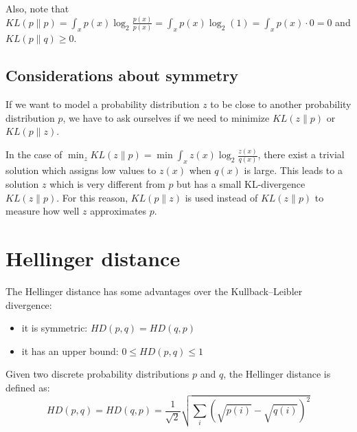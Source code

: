 Also, note that $\mathit{KL}(p \| p) = \int_x p(x) \log_2 \frac{p(x)}{p(x)} = \int_x p(x) \log_2 (1) = \int_x p(x) \cdot 0 = 0$
and $\mathit{KL}(p \| q) \geq 0$.

\subsection{Considerations about symmetry}

If we want to model a probability distribution $z$ to be close to another probability distribution $p$, we have to ask ourselves if we need to minimize $\mathit{KL}(z \| p)$ or $\mathit{KL}(p \| z)$.

In the case of $\min_{z} \mathit{KL}(z \| p) = \min \int_x z(x) \log_2 \frac{z(x)}{q(x)}$, there exist a trivial solution which assigns low values to $z(x)$ when $q(x)$ is large.
This leads to a solution $z$ which is very different from $p$ but has a small KL-divergence $\mathit{KL}(z \| p)$.
For this reason, $\mathit{KL}(p \| z)$ is used instead of $\mathit{KL}(z \| p)$ to measure how well $z$ approximates $p$.

\section{Hellinger distance}
The Hellinger distance has some advantages over the Kullback–Leibler divergence:
\begin{itemize}
    \item it is symmetric: $\mathit{HD}(p, q) = \mathit{HD}(q, p)$
    \item it has an upper bound: $0 \leq \mathit{HD}(p, q) \leq 1$
\end{itemize}

Given two discrete probability distributions $p$ and $q$, the Hellinger distance is defined as:
$$\mathit{HD}(p, q) = \mathit{HD}(q, p) = \frac{1}{\sqrt{2}} \sqrt{\sum_i (\sqrt{p(i)} - \sqrt{q(i)})^2}$$